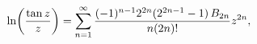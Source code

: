 \[\mathop{\ln\/}\nolimits\!\left(\frac{\mathop{\tan\/}\nolimits z}{z}\right)=%
\sum_{n=1}^{\infty}\frac{(-1)^{n-1}2^{2n}(2^{2n-1}-1)\mathop{B_{2n}\/}%
\nolimits}{n(2n)!}z^{2n},\]